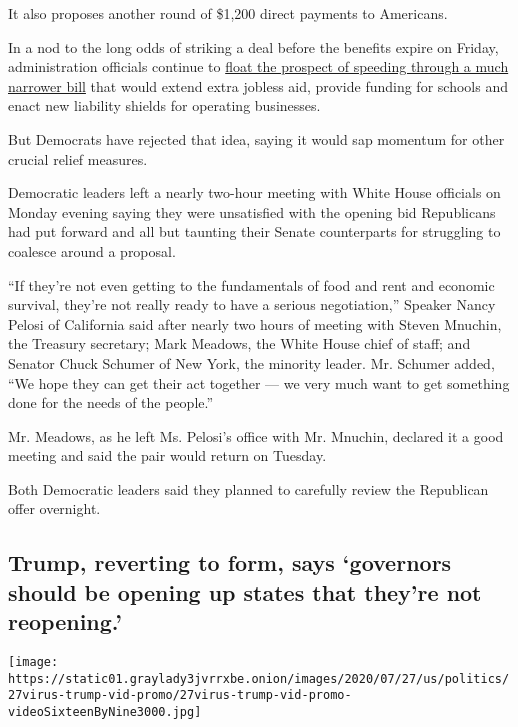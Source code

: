 It also proposes another round of \$1,200 direct payments to Americans.

In a nod to the long odds of striking a deal before the benefits expire
on Friday, administration officials continue to
\href{https://slack-redir.net/link?url=https\%3A\%2F\%2Fwww.nytimes3xbfgragh.onion\%2F2020\%2F07\%2F26\%2Fus\%2Fpolitics\%2Fcoronavirus-stimulus-bill-unemployment.html}{float
the prospect of speeding through a much narrower bill} that would extend
extra jobless aid, provide funding for schools and enact new liability
shields for operating businesses.

But Democrats have rejected that idea, saying it would sap momentum for
other crucial relief measures.

Democratic leaders left a nearly two-hour meeting with White House
officials on Monday evening saying they were unsatisfied with the
opening bid Republicans had put forward and all but taunting their
Senate counterparts for struggling to coalesce around a proposal.

``If they're not even getting to the fundamentals of food and rent and
economic survival, they're not really ready to have a serious
negotiation,'' Speaker Nancy Pelosi of California said after nearly two
hours of meeting with Steven Mnuchin, the Treasury secretary; Mark
Meadows, the White House chief of staff; and Senator Chuck Schumer of
New York, the minority leader. Mr. Schumer added, ``We hope they can get
their act together --- we very much want to get something done for the
needs of the people.''

Mr. Meadows, as he left Ms. Pelosi's office with Mr. Mnuchin, declared
it a good meeting and said the pair would return on Tuesday.

Both Democratic leaders said they planned to carefully review the
Republican offer overnight.

\hypertarget{trump-reverting-to-form-says-governors-should-be-opening-up-states-that-theyre-not-reopening}{%
\subsection{Trump, reverting to form, says `governors should be opening
up states that they're not
reopening.'}\label{trump-reverting-to-form-says-governors-should-be-opening-up-states-that-theyre-not-reopening}}

\texttt{[image: https://static01.graylady3jvrrxbe.onion/images/2020/07/27/us/politics/27virus-trump-vid-promo/27virus-trump-vid-promo-videoSixteenByNine3000.jpg]}


